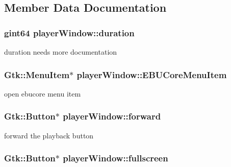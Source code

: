 \subsection{Member Data Documentation}
\hypertarget{classplayerWindow_a80d3c4a892045f6f0a2853407e74af33}{
\subsubsection[{duration}]{\setlength{\rightskip}{0pt plus 5cm}gint64 player\-Window\-::duration\hspace{0.3cm}{\ttfamily [protected]}}}\label{classplayerWindow_a80d3c4a892045f6f0a2853407e74af33}
duration needs more documentation \hypertarget{classplayerWindow_a455c53a2c8dd4edcfd2e74c4920fccb2}{
\subsubsection[{E\-B\-U\-Core\-Menu\-Item}]{\setlength{\rightskip}{0pt plus 5cm}Gtk\-::\-Menu\-Item$\ast$ player\-Window\-::\-E\-B\-U\-Core\-Menu\-Item\hspace{0.3cm}{\ttfamily [protected]}}}\label{classplayerWindow_a455c53a2c8dd4edcfd2e74c4920fccb2}
open ebucore menu item \hypertarget{classplayerWindow_acbb28791ab52cec384ca908fb2574260}{
\subsubsection[{forward}]{\setlength{\rightskip}{0pt plus 5cm}Gtk\-::\-Button$\ast$ player\-Window\-::forward\hspace{0.3cm}{\ttfamily [protected]}}}\label{classplayerWindow_acbb28791ab52cec384ca908fb2574260}
forward the playback button \hypertarget{classplayerWindow_a3da94085afe63001f55c12338710fa2c}{
\subsubsection[{fullscreen}]{\setlength{\rightskip}{0pt plus 5cm}Gtk\-::\-Button$\ast$ player\-Window\-::fullscreen\hspace{0.3cm}{\ttfamily [protected]}}}\label{classplayerWindow_a3da94085afe63001f55c12338710fa2c}
